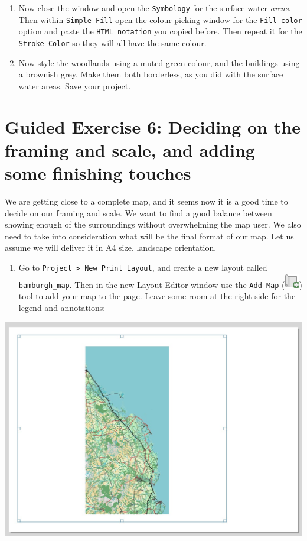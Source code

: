 \documentclass[
  letterpaper,
  DIV=11,
  numbers=noendperiod]{scrreprt}
\providecommand{\tightlist}{%
  \setlength{\itemsep}{0pt}\setlength{\parskip}{0pt}}\usepackage{longtable,booktabs,array}
\begin{document}
\begin{enumerate}
\def\labelenumi{(\arabic{enumi})}
\setcounter{enumi}{212}
\item
  Now close the window and open the \texttt{Symbology} for the surface
  water \emph{areas}. Then within \texttt{Simple\ Fill} open the colour
  picking window for the \texttt{Fill\ color} option and paste the
  \texttt{HTML\ notation} you copied before. Then repeat it for the
  \texttt{Stroke\ Color} so they will all have the same colour.
\item
  Now style the woodlands using a muted green colour, and the buildings
  using a brownish grey. Make them both borderless, as you did with the
  surface water areas. Save your project.
\end{enumerate}

\section{Guided Exercise 6: Deciding on the framing and scale, and
adding some finishing
touches}\label{guided-exercise-6-deciding-on-the-framing-and-scale-and-adding-some-finishing-touches}

We are getting close to a complete map, and it seems now it is a good
time to decide on our framing and scale. We want to find a good balance
between showing enough of the surroundings without overwhelming the map
user. We also need to take into consideration what will be the final
format of our map. Let us assume we will deliver it in A4 size,
landscape orientation.

\begin{enumerate}
\def\labelenumi{(\arabic{enumi})}
\setcounter{enumi}{214}
\tightlist
\item
  Go to \texttt{Project\ \textgreater{}\ New\ Print\ Layout}, and create
  a new layout called \texttt{bamburgh\_map}. Then in the new Layout
  Editor window use the \texttt{Add\ Map}
  (\includegraphics{index_files/mediabag/mActionAddMap1.png}) tool to
  add your map to the page. Leave some room at the right side for the
  legend and annotations:
\end{enumerate}

\includegraphics{images/lab_7/lab7_fig12_frame.jpg}
\end{document}
